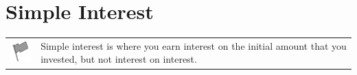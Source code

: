     \label{m39332*cid5}
            \section{ Simple Interest}
            \nopagebreak
            
      
\par
            \label{m39332*fhsst!!!underscore!!!id906}\begin{definition}
	  \begin{tabular*}{15 cm}{m{15 mm}m{}}
	\hspace*{-50pt}  \includegraphics[width=0.5in]{col11306.imgs/psflag2.png}   & \Definition{   \label{id2476740}\textbf{ Simple Interest }} { \label{m39332*meaningfhsst!!!underscore!!!id906}
      \label{m39332*id69230}Simple interest is where you earn interest on the initial amount that you invested, but not interest on interest. \par 
       } 
      \end{tabular*}
      \end{definition}

